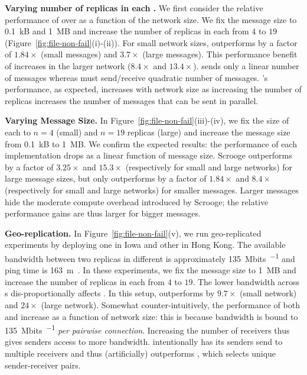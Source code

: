 {\bf Varying number of replicas in each \RSM{}.}
We first consider the relative performance of \Scrooge{} over \ATA{} as a function of the network size.
We fix the message size to \SI{0.1}{kB} and \SI{1}{MB} and increase the number of replicas in each \RSM{} from $4$ to $19$ (Figure~\ref{fig:file-non-fail}(i)-(ii)). For small network sizes, \Scrooge{} outperforms \ATA{} by a factor of $1.84\times$ (small messages) and $3.7\times$ (large messages). 
This performance benefit of \Scrooge{} increases
in the larger network ($8.4\times$ and $13.4\times$). \Scrooge{} sends only a linear number of messages whereas \ATA{} must send/receive quadratic number of messages. 
\OTO{}'s performance, as expected, increases with network size as increasing the number of replicas increases the number of messages that can be sent in parallel.

{\bf Varying Message Size.}
In Figure~\ref{fig:file-non-fail}(iii)-(iv), we fix the size of each \RSM{} to $n=4$ (small) and $n=19$ replicas (large)
and increase the message size from \SI{0.1}{kB} to \SI{1}{MB}.  We confirm the expected results: the performance of each \CCC{} implementation drops as a linear function of message size. Scrooge outperforms \ATA{} by a factor of $3.25\times$ and $15.3\times$ (respectively for small and large networks) for large message sizes, 
but only outperforms \ATA{} by a factor of $1.84\times$ and $8.4\times$ (respectively for small and large networks) for smaller messages. Larger messages hide the moderate compute overhead introduced by Scrooge; the relative performance gains are thus larger for bigger messages.

{\bf Geo-replication.} 
In Figure~\ref{fig:file-non-fail}(v), we run geo-replicated experiments by deploying one \RSM{} in Iowa and other \RSM{} in Hong Kong. 
The available bandwidth between two replicas in different  is approximately \SI{135}{Mbits\per\sec} and ping time is \SI{163}{m\sec}.
In these experiments, we fix the message size to \SI{1}{MB} and increase the number of replicas in each \RSM{} from $4$ to $19$. The lower bandwidth across \RSM{}s dis-proportionally affects \ATA{}. 
In this setup, \Scrooge{} outperforms \ATA{} by $9.7\times$ (small network) and $24\times$ (large network). Somewhat counter-intuitively, the performance of both \Scrooge{} and \OTO{} increase as a function of network size: this is because bandwidth is bound to \SI{135}{Mbits\per\sec} 
\textit{per pairwise connection}. Increasing the number of receivers thus gives senders access to more bandwidth. \Scrooge{} intentionally has its senders send to multiple receivers and thus (artificially) outperforms \OTO{}, which selects unique sender-receiver pairs. 


